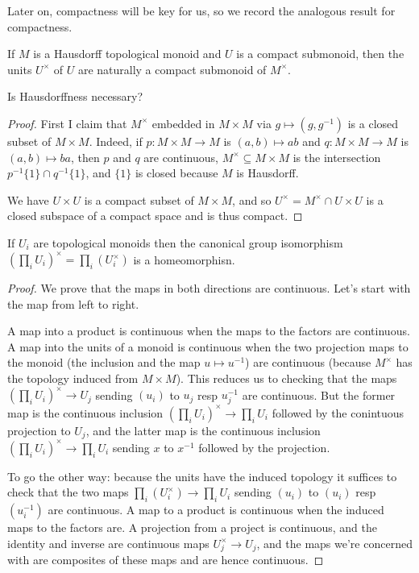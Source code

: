 Later on, compactness will be key for us, so we record the analogous result
for compactness.

\begin{lemma}
  \label{Submonoid.units_isCompact}
  \leanok
  If $M$ is a Hausdorff topological monoid and $U$ is a compact submonoid,
  then the units $U^\times$ of $U$ are naturally a compact submonoid of $M^\times$.
\end{lemma}
\begin{remark} Is Hausdorffness necessary?
\end{remark}
\begin{proof}
  First I claim that $M^\times$ embedded in $M\times M$ via $g\mapsto (g,g^{-1})$
  is a closed subset of $M\times M$. Indeed, if $p:M\times M\to M$ is $(a,b)\mapsto ab$
  and $q:M\times M\to M$ is $(a,b)\mapsto ba$, then $p$ and $q$ are continuous,
  $M^\times\subseteq M\times M$ is the intersection
  $p^{-1}\{1\}\cap q^{-1}\{1\}$, and $\{1\}$ is closed because $M$ is Hausdorff.

  We have $U\times U$ is a compact subset of $M\times M$, and so
  $U^\times=M^\times\cap U\times U$ is a closed subspace of a compact space
  and is thus compact.
\end{proof}

\begin{lemma}
  \label{ContinuousMulEquiv.piUnits}
  \leanok
  If $U_i$ are topological monoids then the canonical
  group isomorphism $(\prod_i U_i)^\times=\prod_i(U_i^\times)$ is a homeomorphisn.
\end{lemma}
\begin{proof} We prove that the maps in both directions are continuous. Let's start
  with the map from left to right.

  A map into a product is continuous when the maps to the factors
  are continuous. A map into the units of a monoid is continuous when the
  two projection maps to the monoid (the inclusion and the map $u\mapsto u^{-1}$)
  are continuous (because $M^\times$ has the topology induced from $M\times M$).
  This reduces us to checking that the maps $(\prod_i U_i)^\times\to U_j$
  sending $(u_i)$ to $u_j$ resp $u_j^{-1}$ are continuous. But the former map
  is the continuous inclusion $(\prod_i U_i)^\times\to\prod_i U_i$ followed
  by the conintuous projection to $U_j$, and the latter map is the continuous
  inclusion $(\prod_i U_i)^\times\to\prod_i U_i$ sending $x$ to $x^{-1}$
  followed by the projection.

  To go the other way: because the units have the induced topology it suffices
  to check that the two maps $\prod_i(U_i^\times)\to\prod_i U_i$
  sending $(u_i)$ to $(u_i)$ resp $(u_i^{-1})$ are continuous. A map
  to a product is continuous when the induced maps to the factors are.
  A projection from a project is continuous, and the identity and inverse are
  continuous maps $U_j^\times\to U_j$, and the maps we're concerned with are composites
  of these maps and are hence continuous.
\end{proof}

